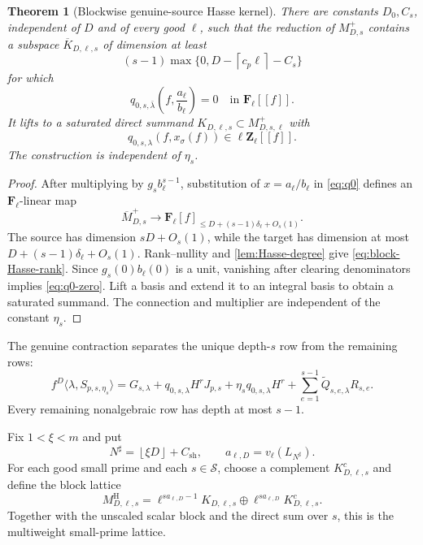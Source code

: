 \documentclass[11pt]{article}
\newtheorem{theorem}{Theorem}[section]
\theoremstyle{definition}
\theoremstyle{remark}
\newcommand{\Z}{\mathbf Z}
\newcommand{\F}{\mathbf F}
\newcommand{\floor}[1]{\left\lfloor #1\right\rfloor}
\newcommand{\ceil}[1]{\left\lceil #1\right\rceil}
\begin{document}
\begin{theorem}[Blockwise genuine-source Hasse kernel]
\label{thm:block-Hasse}
There are constants $D_0,C_s$, independent of $D$ and of every good $\ell$,
such that the reduction of $M_{D,s}^+$ contains a subspace
$\overline K_{D,\ell,s}$ of dimension at least
\begin{equation}\label{eq:block-Hasse-rank}
 (s-1)\max\{0,D-\ceil{c_p\ell}-C_s\}
\end{equation}
for which
\begin{equation}\label{eq:q0-zero}
 q_{0,s,\bar\lambda}
 \left(f,\frac{a_\ell}{b_\ell}\right)=0
 \quad\text{in }\F_\ell[[f]].
\end{equation}
It lifts to a saturated direct summand $K_{D,\ell,s}\subset M_{D,s,\ell}^+$
with
\begin{equation}\label{eq:q0-divisible}
 q_{0,s,\lambda}(f,x_\sigma(f))\in\ell\Z_\ell[[f]].
\end{equation}
The construction is independent of $\eta_s$.
\end{theorem}

\begin{proof}
After multiplying by $g_s b_\ell^{s-1}$, substitution of
$x=a_\ell/b_\ell$ in \eqref{eq:q0} defines an $\F_\ell$-linear map
\[
 \overline M_{D,s}^+
 \longrightarrow
 \F_\ell[f]_{\le D+(s-1)\delta_\ell+O_s(1)}.
\]
The source has dimension $sD+O_s(1)$, while the target has dimension at most
$D+(s-1)\delta_\ell+O_s(1)$.  Rank--nullity and
\cref{lem:Hasse-degree} give \eqref{eq:block-Hasse-rank}.  Since
$g_s(0)b_\ell(0)$ is a unit, vanishing after clearing denominators implies
\eqref{eq:q0-zero}.  Lift a basis and extend it to an integral basis to obtain
a saturated summand.  The connection and multiplier are independent of the
constant $\eta_s$.
\end{proof}

The genuine contraction separates the unique depth-$s$ row from the remaining
rows:
\begin{equation}\label{eq:deepest-decomp}
 f^D\langle\lambda,S_{p,s,\eta_s}\rangle
 =G_{s,\lambda}+q_{0,s,\lambda}H^rJ_{p,s}
 +\eta_sq_{0,s,\lambda}H^r
 +\sum_{e=1}^{s-1}\widetilde Q_{s,e,\lambda}R_{s,e}.
\end{equation}
Every remaining nonalgebraic row has depth at most $s-1$.

Fix $1<\xi<m$ and put
\[
 N^\sharp=\floor{\xi D}+C_{\mathrm{sh}},
 \qquad a_{\ell,D}=v_\ell(L_{N^\sharp}).
\]
For each good small prime and each $s\in\mathcal S$, choose a complement
$K^c_{D,\ell,s}$ and define the block lattice
\begin{equation}\label{eq:block-hybrid-lattice}
 M_{D,\ell,s}^{\mathrm H}
 =\ell^{sa_{\ell,D}-1}K_{D,\ell,s}
 \oplus\ell^{sa_{\ell,D}}K^c_{D,\ell,s}.
\end{equation}
Together with the unscaled scalar block and the direct sum over $s$, this is
the multiweight small-prime lattice.
\end{document}
